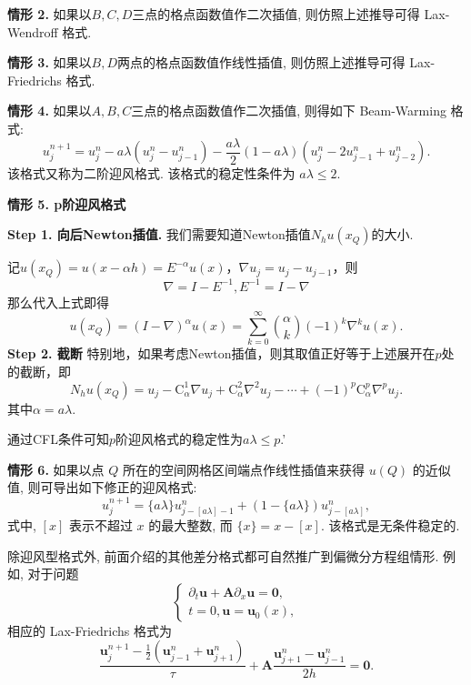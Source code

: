 \noindent\textbf{情形 2.} 如果以$B,C,D$三点的格点函数值作二次插值, 则仿照上述推导可得 Lax-Wendroff 格式.\par
\noindent\textbf{情形 3.} 如果以$B,D$两点的格点函数值作线性插值, 则仿照上述推导可得 Lax-Friedrichs 格式.\par
\noindent\textbf{情形 4.} 如果以$A,B,C$三点的格点函数值作二次插值, 则得如下 Beam-Warming 格式:
\begin{equation}
    u_j^{n+1} = u_j^n - a\lambda(u_j^n - u_{j-1}^n) - \frac{a\lambda}{2}(1-a\lambda)(u_j^n - 2u_{j-1}^n + u_{j-2}^n).
\end{equation}
该格式又称为二阶迎风格式. 该格式的稳定性条件为 $a\lambda \leq 2$.\par
\noindent\textbf{情形 5. p阶迎风格式} \par
\noindent\textbf{Step 1. 向后Newton插值.} 我们需要知道Newton插值$N_hu(x_Q)$的大小.\par
记$u(x_Q)=u(x-\alpha h)=E^{-\alpha}u(x)$，$\nabla  u_j=u_j-u_{j-1}$，则
\begin{equation*}
    \nabla = I-E^{-1},E^{-1}=I-\nabla
\end{equation*}
那么代入上式即得
\begin{equation*}
    u(x_Q)=(I-\nabla)^\alpha u(x)=\sum_{k=0}^\infty \binom{\alpha}{k}(-1)^k \nabla^k u(x).
\end{equation*}
\noindent\textbf{Step 2. 截断 }特别地，如果考虑Newton插值，则其取值正好等于上述展开在$p$处的截断，即
\begin{equation*}
    N_hu(x_Q)=u_j-\mathrm{C}_\alpha^1\nabla u_j+\mathrm{C}_\alpha^2\nabla^2 u_j-\cdots + (-1)^p \mathrm{C}_\alpha^p \nabla^p u_j.
\end{equation*}
其中$\alpha=a\lambda$.\par

通过CFL条件可知$p$阶迎风格式的稳定性为$a\lambda\leq p$.'




\noindent\textbf{情形 6.} 如果以点 $Q$ 所在的空间网格区间端点作线性插值来获得 $u(Q)$ 的近似值, 则可导出如下修正的迎风格式:
\begin{equation}
    u_j^{n+1} = \{a\lambda\} u_{j-[a\lambda]-1}^n + (1-\{a\lambda\}) u_{j-[a\lambda]}^n,
\end{equation}
式中, $[x]$ 表示不超过 $x$ 的最大整数, 而 $\{x\} = x - [x]$. 该格式是无条件稳定的.

除迎风型格式外, 前面介绍的其他差分格式都可自然推广到偏微分方程组情形. 例如, 对于问题
\begin{equation}
    \begin{cases}
        \partial_t \boldsymbol{u} + \boldsymbol{A} \partial_x \boldsymbol{u} = \boldsymbol{0}, \\
        t=0, \boldsymbol{u} = \boldsymbol{u}_0(x),
    \end{cases}
\end{equation}
相应的 Lax-Friedrichs 格式为
\begin{equation}
    \frac{\boldsymbol{u}_j^{n+1} - \frac{1}{2}(\boldsymbol{u}_{j-1}^n + \boldsymbol{u}_{j+1}^n)}{\tau} + \boldsymbol{A} \frac{\boldsymbol{u}_{j+1}^n - \boldsymbol{u}_{j-1}^n}{2h} = \boldsymbol{0}.
\end{equation}

